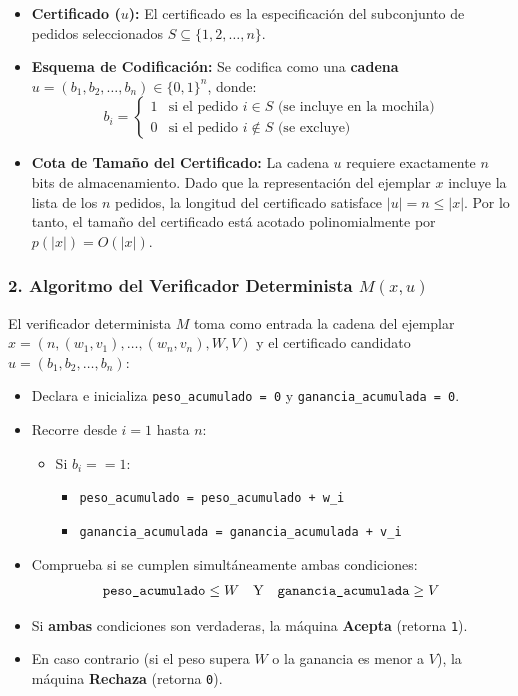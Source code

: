 \begin{itemize}[leftmargin=*]
    \item \textbf{Certificado ($u$):} El certificado es la especificación del subconjunto de pedidos seleccionados $S \subseteq \{1, 2, \dots, n\}$.
    \item \textbf{Esquema de Codificación:} Se codifica como una \textbf{cadena} $u = (b_1, b_2, \dots, b_n) \in \{0, 1\}^n$, donde:
    \[ b_i = \begin{cases} 1 & \text{si el pedido } i \in S \text{ (se incluye en la mochila)} \\ 0 & \text{si el pedido } i \notin S \text{ (se excluye)} \end{cases} \]
    \item \textbf{Cota de Tamaño del Certificado:} La cadena $u$ requiere exactamente $n$ bits de almacenamiento. Dado que la representación del ejemplar $x$ incluye la lista de los $n$ pedidos, la longitud del certificado satisface $|u| = n \le |x|$. Por lo tanto, el tamaño del certificado está acotado polinomialmente por $p(|x|) = O(|x|)$.
\end{itemize}

\subsubsection*{2. Algoritmo del Verificador Determinista $M(x, u)$}

El verificador determinista $M$ toma como entrada la cadena del ejemplar $x = (n, (w_1, v_1), \dots, (w_n, v_n), W, V)$ y el certificado candidato $u = (b_1, b_2, \dots, b_n)$:

\begin{itemize}[leftmargin=*]
    \item Declara e inicializa \texttt{peso\_acumulado = 0} y \texttt{ganancia\_acumulada = 0}.
    \item Recorre desde $i = 1$ hasta $n$:
    \begin{itemize}[leftmargin=*]
        \item Si $b_i == 1$:
        \begin{itemize}[leftmargin=*]
            \item \texttt{peso\_acumulado = peso\_acumulado + w\_i}
            \item \texttt{ganancia\_acumulada = ganancia\_acumulada + v\_i}
        \end{itemize}
    \end{itemize}
    \item Comprueba si se cumplen simultáneamente ambas condiciones:
    \[ \text{\texttt{peso\_acumulado}} \le W \quad \text{Y} \quad \text{\texttt{ganancia\_acumulada}} \ge V \]
    \item Si \textbf{ambas} condiciones son verdaderas, la máquina \textbf{Acepta} (retorna \texttt{1}).
    \item En caso contrario (si el peso supera $W$ o la ganancia es menor a $V$), la máquina \textbf{Rechaza} (retorna \texttt{0}).
\end{itemize}

